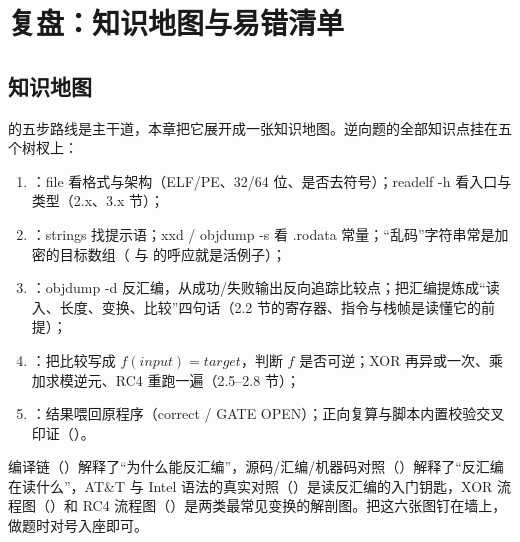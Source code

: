 \documentclass[UTF8,12pt,oneside]{ctexbook}
\begin{document}


\chapter{复盘：知识地图与易错清单}

\section{知识地图}
 的五步路线是主干道，本章把它展开成一张知识地图。逆向题的全部知识点挂在五个树杈上：
\begin{enumerate}
\item {}：file 看格式与架构（ELF/PE、32/64 位、是否去符号）；readelf -h 看入口与类型（2.x、3.x 节）；
\item {}：strings 找提示语；xxd / objdump -s 看 .rodata 常量；“乱码”字符串常是加密的目标数组（ 与  的呼应就是活例子）；
\item {}：objdump -d 反汇编，从成功/失败输出反向追踪比较点；把汇编提炼成“读入、长度、变换、比较”四句话（2.2 节的寄存器、指令与栈帧是读懂它的前提）；
\item {}：把比较写成 $f(input) = target$，判断 $f$ 是否可逆；XOR 再异或一次、乘加求模逆元、RC4 重跑一遍（2.5--2.8 节）；
\item {}：结果喂回原程序（correct / GATE OPEN）；正向复算与脚本内置校验交叉印证（）。
\end{enumerate}
编译链（）解释了“为什么能反汇编”，源码/汇编/机器码对照（）解释了“反汇编在读什么”，AT\&T 与 Intel 语法的真实对照（）是读反汇编的入门钥匙，XOR 流程图（）和 RC4 流程图（）是两类最常见变换的解剖图。把这六张图钉在墙上，做题时对号入座即可。
\end{document}
